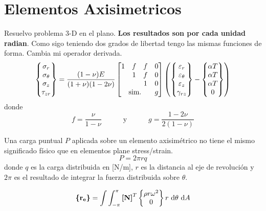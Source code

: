 \section{Elementos Axisimetricos}
Resuelvo problema 3-D en el plano. \textbf{Los resultados son por cada unidad radian}. Como sigo teniendo dos grados de libertad tengo las mismas funciones de forma. Cambia mi operador derivada.
\[
\begin{Bmatrix}
\sigma_\radial \\
\sigma_\theta \\
\sigma_z \\
\tau_{z\radial}
\end{Bmatrix}
= \frac{(1-\nu)E}{(1+\nu)(1-2\nu)}
\begin{bmatrix}
1 & \eff & \eff & 0 \\
& 1 & \eff & 0 \\
& & 1 & 0 \\
\textrm{sim.}\unspace& & & g 
\end{bmatrix}
\left(
\begin{Bmatrix}
\varepsilon_\radial \\
\varepsilon_\theta \\
\varepsilon_z \\
\gamma_{\radial z}
\end{Bmatrix}
-
\begin{Bmatrix}
\alpha T\\
\alpha T \\
\alpha T \\
0
\end{Bmatrix}
\right)
\]
donde 
\[
f=\frac{\nu}{1-\nu}\qquad \quad \textrm{y}\quad \qquad g=\frac{1-2\nu}{2(1-\nu)}
\]

Una carga puntual $P$ aplicada sobre un elemento axisimétrico no tiene el mismo significado físico que en elementos plane stress/strain. 
\[
P=2\pi rq
\]
donde $q$ es la carga distribuida en [N/m], $r$ es la distancia al eje de revolución y $2 \pi$ es el resultado de integrar la fuerza distribuida sobre $\theta$. 

\[
\boldsymbol{\{ }\mathbf{r_e} \boldsymbol{\}} = \int\int_{-\pi}^{\pi} \boldsymbol{[}\mathbf{N} \boldsymbol{]}^T \begin{Bmatrix}
\rho r \omega ^2 \\
0
\end{Bmatrix} r ~\textrm{d} \theta ~\textrm{d} A
\]